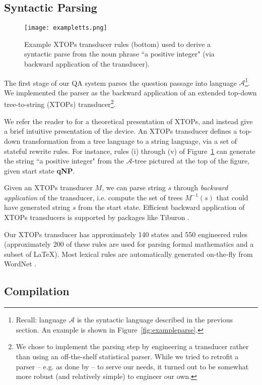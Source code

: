 \documentclass[11pt,letterpaper]{article}
\begin{document}
\subsection{Syntactic Parsing}

\begin{figure}[tb]
\centering
\mbox{\texttt{[image: exampletts.png]}}
\caption{\label{fig:exampletts} Example XTOPs transducer rules (bottom) used to derive a syntactic parse from the noun phrase ``a positive integer" (via backward application of the transducer).}
\end{figure}

The first stage of our QA system parses the question passage into language $\mathcal{A}$\footnote{Recall: language $\mathcal{A}$ is the syntactic language described in the previous section. An example is shown in Figure~\ref{fig:exampleparse}.}. We implemented the parser as the backward application of an extended top-down tree-to-string (XTOPs) transducer\footnote{We chose to implement the parsing step by engineering a transducer rather than using an off-the-shelf statistical parser. While we tried to retrofit a parser -- e.g. as done by \cite{Seo2015SolvingGP} -- to serve our needs, it turned out to be somewhat more robust (and relatively simple) to engineer our own.}.

We refer the reader to \cite{Maletti2009ThePO} for a theoretical presentation of XTOPs, and instead give a brief intuitive presentation of the device. An XTOPs transducer defines a top-down transformation from a tree language to a string language, via a set of stateful rewrite rules. For instance, rules (i) through (v) of Figure~\ref{fig:exampletts} can generate the string ``a positive integer" from the $\mathcal{A}$-tree pictured at the top of the figure, given start state \textbf{qNP}.

Given an XTOPs transducer $M$, we can parse string $s$ through \emph{backward application} of the transducer, i.e. compute the set of trees $M^{-1}(s)$ that could have generated string $s$ from the start state. Efficient backward application of XTOPs transducers is supported by packages like Tiburon \cite{May2006TiburonAW}.

Our XTOPs transducer has approximately 140 states and 550 engineered rules (approximately 200 of these rules are used for parsing formal mathematics and a subset of LaTeX). Most lexical rules are automatically generated on-the-fly from WordNet \cite{miller1995wordnet}.

\subsection{Compilation}
\end{document}

